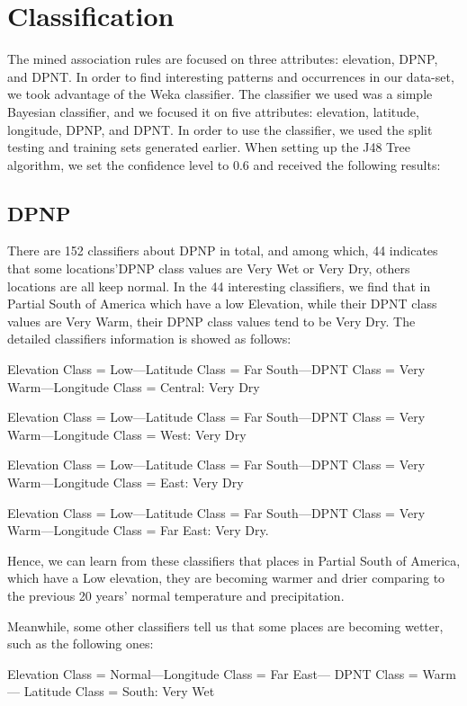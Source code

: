 \documentclass[11pt]{article}
\begin{document}
\section{Classification}

The mined association rules are focused on three attributes: elevation, DPNP, and DPNT. In order to find interesting patterns and occurrences in our data-set, we took advantage of the Weka classifier. The classifier we used was a simple Bayesian classifier, and we focused it on five attributes: elevation, latitude, longitude, DPNP, and DPNT. In order to use the classifier, we used the split testing and training sets generated earlier. When setting up the J48 Tree algorithm, we set the confidence level to 0.6 and received the following results:

\subsection{DPNP}
There are 152 classifiers about DPNP in total, and among which, 44 indicates that some locations\rq DPNP class values are Very Wet or Very Dry, others locations are all keep normal.  In the 44 interesting classifiers, we find that in Partial South of America which have a low Elevation, while their DPNT class values are Very Warm, their DPNP class values tend to be Very Dry. The detailed classifiers information is showed as follows:

Elevation Class = Low---Latitude Class = Far South---DPNT Class = Very Warm---Longitude Class = Central:  Very Dry

Elevation Class = Low---Latitude Class = Far South---DPNT Class = Very Warm---Longitude Class = West:  Very Dry

Elevation Class = Low---Latitude Class = Far South---DPNT Class = Very Warm---Longitude Class = East:  Very Dry

Elevation Class = Low---Latitude Class = Far South---DPNT Class = Very Warm---Longitude Class = Far East:  Very Dry.

Hence, we can learn from these classifiers that places in Partial South of America, which have a Low elevation, they are becoming warmer and drier comparing to the previous 20 years’ normal temperature and precipitation.

Meanwhile, some other classifiers tell us that some places are becoming wetter, such as the following ones:

Elevation Class = Normal---Longitude Class = Far East--- DPNT Class = Warm--- Latitude Class = South:  Very Wet
\end{document}
